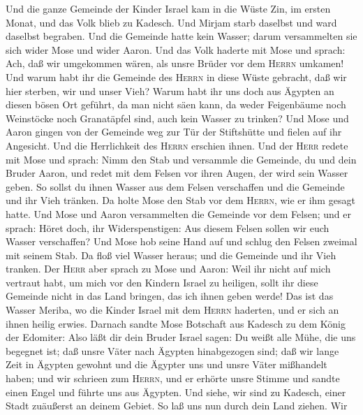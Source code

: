  Und die ganze Gemeinde der Kinder Israel kam in die Wüste
Zin, im ersten Monat, und das Volk blieb zu Kadesch. Und Mirjam starb
daselbst und ward daselbst begraben.  Und die Gemeinde
hatte kein Wasser; darum versammelten sie sich wider Mose und wider
Aaron.  Und das Volk haderte mit Mose und sprach: Ach, daß
wir umgekommen wären, als unsre Brüder vor dem \textsc{Herrn} umkamen!
 Und warum habt ihr die Gemeinde des \textsc{Herrn} in
diese Wüste gebracht, daß wir hier sterben, wir und unser Vieh?
 Warum habt ihr uns doch aus Ägypten an diesen bösen Ort
geführt, da man nicht säen kann, da weder Feigenbäume noch Weinstöcke
noch Granatäpfel sind, auch kein Wasser zu trinken?  Und
Mose und Aaron gingen von der Gemeinde weg zur Tür der Stiftshütte und
fielen auf ihr Angesicht. Und die Herrlichkeit des \textsc{Herrn}
erschien ihnen.  Und der \textsc{Herr} redete mit Mose und
sprach:  Nimm den Stab und versammle die Gemeinde, du und
dein Bruder Aaron, und redet mit dem Felsen vor ihren Augen, der wird
sein Wasser geben. So sollst du ihnen Wasser aus dem Felsen verschaffen
und die Gemeinde und ihr Vieh tränken.  Da holte Mose den
Stab vor dem \textsc{Herrn}, wie er ihm gesagt hatte. 
Und Mose und Aaron versammelten die Gemeinde vor dem Felsen; und er
sprach: Höret doch, ihr Widerspenstigen: Aus diesem Felsen sollen wir
euch Wasser verschaffen?  Und Mose hob seine Hand auf und
schlug den Felsen zweimal mit seinem Stab. Da floß viel Wasser heraus;
und die Gemeinde und ihr Vieh tranken.  Der \textsc{Herr}
aber sprach zu Mose und Aaron: Weil ihr nicht auf mich vertraut habt, um
mich vor den Kindern Israel zu heiligen, sollt ihr diese Gemeinde nicht
in das Land bringen, das ich ihnen geben werde!  Das ist
das Wasser Meriba, wo die Kinder Israel mit dem \textsc{Herrn} haderten,
und er sich an ihnen heilig erwies.  Darnach sandte Mose
Botschaft aus Kadesch zu dem König der Edomiter: Also läßt dir dein
Bruder Israel sagen: Du weißt alle Mühe, die uns begegnet ist;
 daß unsre Väter nach Ägypten hinabgezogen sind; daß wir
lange Zeit in Ägypten gewohnt und die Ägypter uns und unsre Väter
mißhandelt haben;  und wir schrieen zum \textsc{Herrn},
und er erhörte unsre Stimme und sandte einen Engel und führte uns aus
Ägypten. Und siehe, wir sind zu Kadesch, einer Stadt zuäußerst an deinem
Gebiet.  So laß uns nun durch dein Land ziehen. Wir
